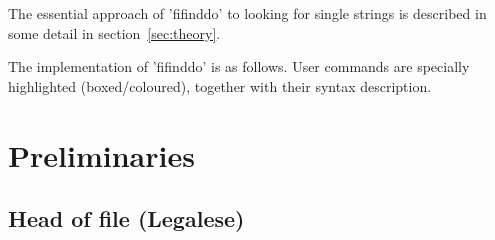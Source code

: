 \documentclass[fleqn]{article}
\begin{document}
The essential approach of 'fifinddo' to looking for single strings is 
described in some detail in section~\ref{sec:theory}.

The implementation of 'fifinddo' is as follows.
User commands are specially highlighted (boxed\slash coloured), 
together with their syntax description. 


\section{Preliminaries}
\subsection{Head of file (Legalese)}
\sloppy 
\ProcessLineMessage{}
\end{document}
